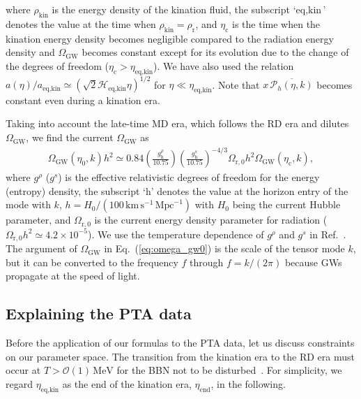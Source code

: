 \documentclass[superscriptaddress, aps, preprintnumbers,
amsmath, amssymb, sort&compress, nofootinbib, 10pt, paper, floatfix]{revtex4-2}
\newcommand{\GW}{\text{GW}}
\newcommand{\MeV}{\text{MeV}}
\newcommand{\hh}{\text{h}}
\newcommand{\eq}{{\text{eq}}}
\newcommand{\rr}{\text{r}}
\newcommand{\cc}{\text{c}}
\newcommand{\kk}{\text{kin}}
\begin{document}
where $\rho_\kk$ is the energy density of the kination fluid, the subscript `$\eq,\kk$' denotes the value at the time when $\rho_\kk = \rho_\rr$, and 
$\eta_\cc$ is the time when the kination energy density becomes negligible compared to the radiation energy density and $\Omega_\GW$ becomes constant except for its evolution due to the change of the degrees of freedom ($\eta_\cc > \eta_{\eq,\kk}$).
We have also used the relation $a(\eta)/a_{\eq,\kk} \simeq (\sqrt{2} \mathcal H_{\eq,\kk} \eta)^{1/2}$ for $\eta \ll \eta_{\eq,\kk}$.
Note that $x\, \overline{\mathcal P_h(\eta,k)}$ becomes constant even during a kination era. 


Taking into account the late-time MD era, which follows the RD era and dilutes $\Omega_\GW$, we find the current $\Omega_\GW$ as~\cite{Inomata:2020lmk}
\begin{align}
        \Omega_\GW(\eta_0, k) h^2 \simeq 0.84 \left( \frac{g^\rho_{\hh}}{10.75} \right) \left( \frac{g^s_{\hh}}{10.75} \right)^{-4/3} \Omega_{\rr,0} h^2  \Omega_\GW(\eta_\cc,k),
        \label{eq:omega_gw0}
\end{align}
where $g^\rho$ ($g^s$) is the effective relativistic degrees of freedom for the energy (entropy) density, the subscript `h' denotes the value at the horizon entry of the mode with $k$, $h = H_0/(100 \, \mathrm{km} \, \mathrm{s}^{-1} \, \mathrm{Mpc}^{-1})$ with $H_0$ being the current Hubble parameter, and $\Omega_{\rr,0}$ is the current energy density parameter for radiation ($\Omega_{\rr,0} h^2 \simeq 4.2 \times 10^{-5}$). We use the temperature dependence of $g^\rho$ and $g^s$ in Ref.~\cite{Saikawa:2018rcs}.
The argument of $\Omega_\GW$ in Eq.~(\ref{eq:omega_gw0}) is the scale of the tensor mode $k$, but it can be converted to the frequency $f$ through $f=k/(2\pi)$ because GWs propagate at the speed of light.

\subsection{Explaining the PTA data}

Before the application of our formulas to the PTA data, let us discuss constraints on our parameter space. 
The transition from the kination era to the RD era must occur at $T>\mathcal O(1)\,\MeV$ for the BBN not to be disturbed~\cite{Co:2021lkc,AristizabalSierra:2023bah}.
For simplicity, we regard $\eta_{\eq,\kk}$ as the end of the kination era, $\eta_\text{end}$, in the following. 
\end{document}
